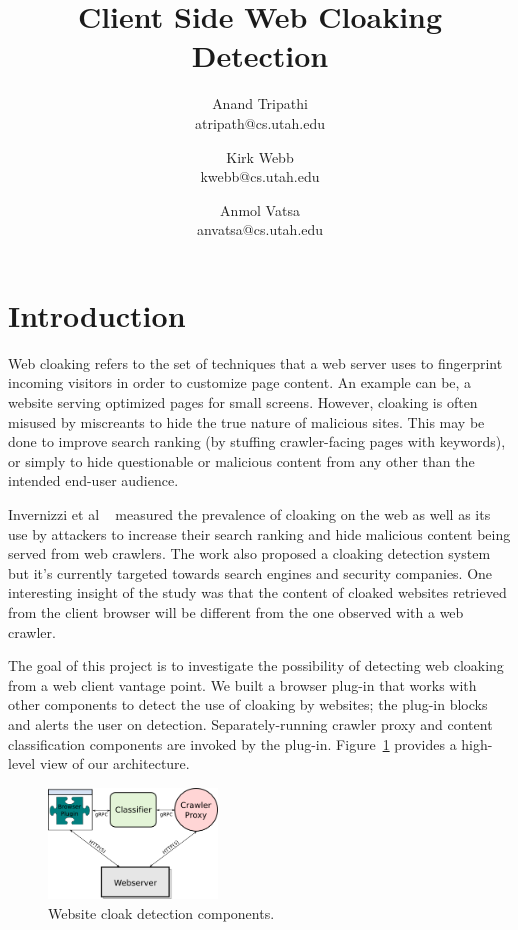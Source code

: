 \documentclass[letterpaper,twocolumn,10pt]{article}
\title{\vspace{-2.0cm}Client Side Web Cloaking Detection}
\author{
Anand Tripathi\\
       atripath@cs.utah.edu
\and 
Kirk Webb\\
       kwebb@cs.utah.edu
\and
Anmol Vatsa\\
       anvatsa@cs.utah.edu
}
\begin{document}
\maketitle

\section{Introduction}
Web cloaking refers to the set of techniques that a web server uses to fingerprint incoming visitors in order to customize page content. An example can be, a website serving optimized pages for small screens. However, cloaking is often misused by miscreants to hide the true nature of malicious sites.  This may be done to improve search ranking (by stuffing crawler-facing pages with keywords), or simply to hide questionable or malicious content from any other than the intended end-user audience.

Invernizzi et al ~\cite{cloak} measured the prevalence of cloaking on the web as well as its use by attackers to increase their search ranking and hide malicious content being served from web crawlers. The work also proposed a cloaking detection system but it's currently targeted towards search engines and security companies. One interesting insight of the study was that the content of cloaked websites retrieved from the client browser will be different from the one observed with a web crawler.

The goal of this project is to investigate the possibility of detecting web cloaking from a web client vantage point.  We built a browser plug-in that works with other components to detect the use of cloaking by websites; the plug-in blocks and alerts the user on detection. Separately-running crawler proxy and content classification components are invoked by the plug-in.  Figure~\ref{fig:arch} provides a high-level view of our architecture.

\begin{figure}[ht]
  \centering
  \includegraphics[width=0.4\textwidth]{./proj-diagram.png}
  \caption{Website cloak detection components.}
  \label{fig:arch}
\end{figure}
\end{document}
